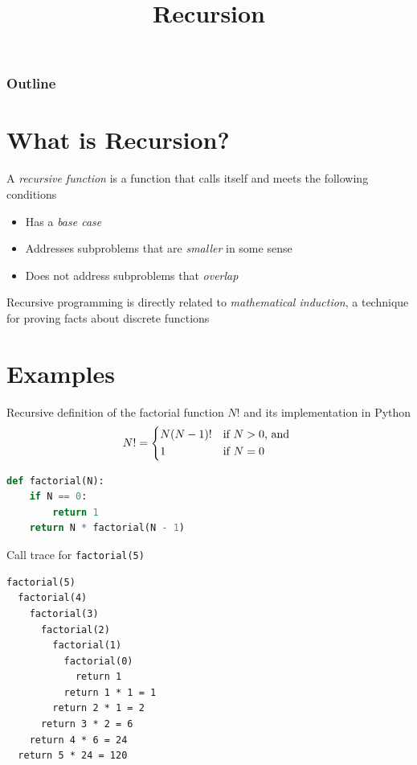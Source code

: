 \documentclass[8pt,a4paper,compress]{beamer}
\title{Recursion}
\date{}
\begin{document}
\begin{frame}
\vfill
\titlepage
\end{frame}

\begin{frame}
\frametitle{Outline}
\tableofcontents
\end{frame}

\section{What is Recursion?}
\begin{frame}[fragile]
A \emph{recursive function} is a function that calls itself and meets the following conditions
\begin{itemize}
\item Has a \emph{base case}
\item Addresses subproblems that are \emph{smaller} in some sense
\item Does not address subproblems that \emph{overlap}
\end{itemize}

\bigskip

Recursive programming is directly related to \emph{mathematical induction}, a technique for proving facts about discrete functions
\end{frame}

\section{Examples}
\begin{frame}[fragile]
Recursive definition of the factorial function $N!$ and its implementation in Python
\[
N! = \begin{dcases*}
N(N-1)! & if $N > 0$, and \\
1       & if $N=0$
\end{dcases*}
\]

\begin{lstlisting}[language=Python]
def factorial(N):
    if N == 0:
        return 1
    return N * factorial(N - 1)
\end{lstlisting}

\bigskip

Call trace for \lstinline{factorial(5)}
\begin{lstlisting}[language={}]
factorial(5)
  factorial(4)
    factorial(3)
      factorial(2)
        factorial(1)
          factorial(0)
            return 1
          return 1 * 1 = 1            
        return 2 * 1 = 2
      return 3 * 2 = 6
    return 4 * 6 = 24
  return 5 * 24 = 120
\end{lstlisting}
\end{frame}
\end{document}
